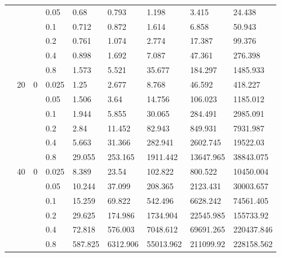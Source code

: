 \begin{longtable}{|l|l|l|l|l|l|l|l|l|}
\cmidrule{4-9} &     &          & 0.05           & 0.68       & 0.793      & 1.198      & 3.415      & 24.438     \\
\cmidrule{4-9} &     &          & 0.1            & 0.712      & 0.872      & 1.614      & 6.858      & 50.943     \\
\cmidrule{4-9} &     &          & 0.2            & 0.761      & 1.074      & 2.774      & 17.387     & 99.376     \\
\cmidrule{4-9} &     &          & 0.4            & 0.898      & 1.692      & 7.087      & 47.361     & 276.398    \\
\cmidrule{4-9} &     &          & 0.8            & 1.573      & 5.521      & 35.677     & 184.297    & 1485.933   \\
\cmidrule{2-9} & 20  & 0        & 0.025          & 1.25       & 2.677      & 8.768      & 46.592     & 418.227    \\
\cmidrule{4-9} &     &          & 0.05           & 1.506      & 3.64       & 14.756     & 106.023    & 1185.012   \\
\cmidrule{4-9} &     &          & 0.1            & 1.944      & 5.855      & 30.065     & 284.491    & 2985.091   \\
\cmidrule{4-9} &     &          & 0.2            & 2.84       & 11.452     & 82.943     & 849.931    & 7931.987   \\
\cmidrule{4-9} &     &          & 0.4            & 5.663      & 31.366     & 282.941    & 2602.745   & 19522.03   \\
\cmidrule{4-9} &     &          & 0.8            & 29.055     & 253.165    & 1911.442   & 13647.965  & 38843.075  \\
\cmidrule{2-9} & 40  & 0        & 0.025          & 8.389      & 23.54      & 102.822    & 800.522    & 10450.004  \\
\cmidrule{4-9} &     &          & 0.05           & 10.244     & 37.099     & 208.365    & 2123.431   & 30003.657  \\
\cmidrule{4-9} &     &          & 0.1            & 15.259     & 69.822     & 542.496    & 6628.242   & 74561.405  \\
\cmidrule{4-9} &     &          & 0.2            & 29.625     & 174.986    & 1734.904   & 22545.985  & 155733.92  \\
\cmidrule{4-9} &     &          & 0.4            & 72.818     & 576.003    & 7048.612   & 69691.265  & 220437.846 \\
\cmidrule{4-9} &     &          & 0.8            & 587.825    & 6312.906   & 55013.962  & 211099.92  & 228158.562 \\ \midrule

\end{longtable}
